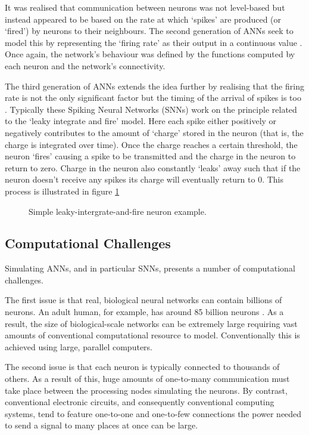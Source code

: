			It was realised that communication between neurons was not level-based but
			instead appeared to be based on the rate at which `spikes' are produced
			(or `fired') by neurons to their neighbours. The second generation of ANNs
			seek to model this by representing the `firing rate' as their output in a
			continuous value \cite{maass97}. Once again, the network's behaviour was
			defined by the functions computed by each neuron and the network's
			connectivity.
			
			The third generation of ANNs extends the idea further by realising that
			the firing rate is not the only significant factor but the timing of the
			arrival of spikes is too \cite{maass01}. Typically these Spiking Neural
			Networks (SNNs) work on the principle related to the `leaky integrate and
			fire' model. Here each spike either positively or negatively contributes
			to the amount of `charge' stored in the neuron (that is, the charge is
			integrated over time). Once the charge reaches a certain threshold, the
			neuron `fires' causing a spike to be transmitted and the charge in the
			neuron to return to zero. Charge in the neuron also constantly `leaks'
			away such that if the neuron doesn't receive any spikes its charge will
			eventually return to 0. This process is illustrated in figure
			\ref{fig:snn-example}
			
			\begin{figure}
				\center
				
				\caption{Simple leaky-intergrate-and-fire neuron example.}
				\label{fig:snn-example}
			\end{figure}
		
		\subsection{Computational Challenges}
			
			Simulating ANNs, and in particular SNNs, presents a number of
			computational challenges.
			
			The first issue is that real, biological neural networks can contain
			billions of neurons. An adult human, for example, has around 85 billion
			neurons \cite{herculano09}. As a result, the size of biological-scale
			networks can be extremely large requiring vast amounts of conventional
			computational resource to model. Conventionally this is achieved using
			large, parallel computers.
			
			The second issue is that each neuron is typically connected to thousands
			of others. As a result of this, huge amounts of one-to-many communication
			must take place between the processing nodes simulating the neurons.  By
			contrast, conventional electronic circuits, and consequently conventional
			computing systems, tend to feature one-to-one and one-to-few connections
			the power needed to send a signal to many places at once can be large.
			
